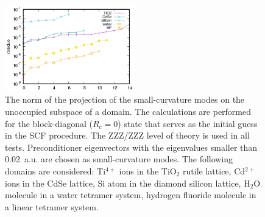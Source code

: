 \documentclass[aps,prl,twocolumn,reprint,amsmath,amssymb]{revtex4-1}
\begin{document}
\begin{figure}
\centering
\includegraphics[width=0.5\textwidth]{residue}
\caption{
The norm of the projection of the small-curvature modes on the unoccupied subspace of a domain. 
The calculations are performed for the block-diagonal ($R_c = 0$) state that serves as the initial guess in the SCF procedure. 
The ZZZ/ZZZ level of theory is used in all tests. 
Preconditioner eigenvectors with the eigenvalues smaller than 0.02~a.u. are chosen as small-curvature modes. 
The following domains are considered: Ti$^{4+}$ ions in the TiO$_2$ rutile lattice, Cd$^{2+}$ ions in the CdSe lattice, Si atom in the diamond silicon lattice, H$_2$O molecule in a water tetramer system, hydrogen fluoride molecule in a linear tetramer system.}
\label{fig:projection}
\end{figure}

\end{document}

